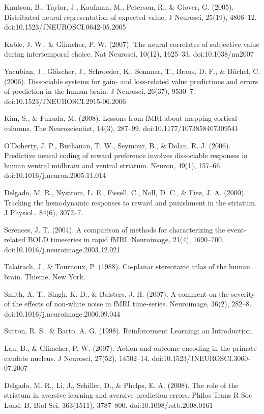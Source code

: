 Knutson, B., Taylor, J., Kaufman, M., Peterson, R., & Glover, G. (2005). Distributed neural representation of expected value. J Neurosci, 25(19), 4806–12. doi:10.1523/JNEUROSCI.0642-05.2005

Kable, J. W., & Glimcher, P. W. (2007). The neural correlates of subjective value during intertemporal choice. Nat Neurosci, 10(12), 1625–33. doi:10.1038/nn2007

Yacubian, J., Gläscher, J., Schroeder, K., Sommer, T., Braus, D. F., & Büchel, C. (2006). Dissociable systems for gain- and loss-related value predictions and errors of prediction in the human brain. J Neurosci, 26(37), 9530–7. doi:10.1523/JNEUROSCI.2915-06.2006

Kim, S., & Fukuda, M. (2008). Lessons from fMRI about mapping cortical columns. The Neuroscientist, 14(3), 287–99. doi:10.1177/1073858407309541

O'Doherty, J. P., Buchanan, T. W., Seymour, B., & Dolan, R. J. (2006). Predictive neural coding of reward preference involves dissociable responses in human ventral midbrain and ventral striatum. Neuron, 49(1), 157–66. doi:10.1016/j.neuron.2005.11.014

Delgado, M. R., Nystrom, L. E., Fissell, C., Noll, D. C., & Fiez, J. A. (2000). Tracking the hemodynamic responses to reward and punishment in the striatum. J Physiol., 84(6), 3072–7.

Serences, J. T. (2004). A comparison of methods for characterizing the event-related BOLD timeseries in rapid fMRI. Neuroimage, 21(4), 1690–700. doi:10.1016/j.neuroimage.2003.12.021

Talairach, J., & Tournoux, P. (1988). Co-planar stereotaxic atlas of the human brain. Thieme, New York.

Smith, A. T., Singh, K. D., & Balsters, J. H. (2007). A comment on the severity of the effects of non-white noise in fMRI time-series. Neuroimage, 36(2), 282–8. doi:10.1016/j.neuroimage.2006.09.044

Sutton, R. S., & Barto, A. G. (1998). Reinforcement Learning: an Introduction.

Lau, B., & Glimcher, P. W. (2007). Action and outcome encoding in the primate caudate nucleus. J Neurosci, 27(52), 14502–14. doi:10.1523/JNEUROSCI.3060-07.2007

Delgado, M. R., Li, J., Schiller, D., & Phelps, E. A. (2008). The role of the striatum in aversive learning and aversive prediction errors. Philos Trans R Soc Lond, B, Biol Sci, 363(1511), 3787–800. doi:10.1098/rstb.2008.0161

